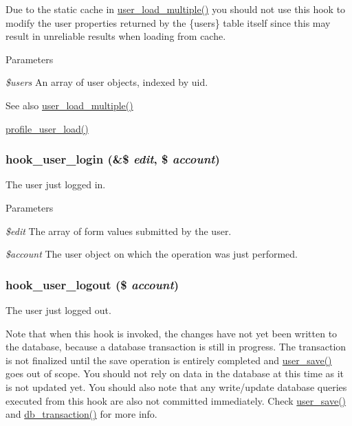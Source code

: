 Due to the static cache in \hyperlink{user_8module_a9f73ad4a543faed0e38e8ea170bff32e}{user\_\-load\_\-multiple()} you should not use this hook to modify the user properties returned by the \{users\} table itself since this may result in unreliable results when loading from cache.


\begin{DoxyParams}{Parameters}
\item[{\em \$users}]An array of user objects, indexed by uid.\end{DoxyParams}
\begin{DoxySeeAlso}{See also}
\hyperlink{user_8module_a9f73ad4a543faed0e38e8ea170bff32e}{user\_\-load\_\-multiple()} 

\hyperlink{profile_8module_a8e273f03e749b1a38f2891d138675b73}{profile\_\-user\_\-load()} 
\end{DoxySeeAlso}
\hypertarget{group__hooks_ga8cce712a39ee6e57bd506b5a0c457d09}{
\subsubsection[{hook\_\-user\_\-login}]{\setlength{\rightskip}{0pt plus 5cm}hook\_\-user\_\-login (\&\$ {\em edit}, \/  \$ {\em account})}}
\label{group__hooks_ga8cce712a39ee6e57bd506b5a0c457d09}
The user just logged in.


\begin{DoxyParams}{Parameters}
\item[{\em \$edit}]The array of form values submitted by the user. \item[{\em \$account}]The user object on which the operation was just performed. \end{DoxyParams}
\hypertarget{group__hooks_ga49a4bb63d4b643cf9e3feb2266fe4865}{
\subsubsection[{hook\_\-user\_\-logout}]{\setlength{\rightskip}{0pt plus 5cm}hook\_\-user\_\-logout (\$ {\em account})}}
\label{group__hooks_ga49a4bb63d4b643cf9e3feb2266fe4865}
The user just logged out.

Note that when this hook is invoked, the changes have not yet been written to the database, because a database transaction is still in progress. The transaction is not finalized until the save operation is entirely completed and \hyperlink{user_8module_a857b652072abb243e0b44b02c3746a99}{user\_\-save()} goes out of scope. You should not rely on data in the database at this time as it is not updated yet. You should also note that any write/update database queries executed from this hook are also not committed immediately. Check \hyperlink{user_8module_a857b652072abb243e0b44b02c3746a99}{user\_\-save()} and \hyperlink{group__database_gabdd0e69f5b2c63f8ad9e76f0fdf552be}{db\_\-transaction()} for more info.


